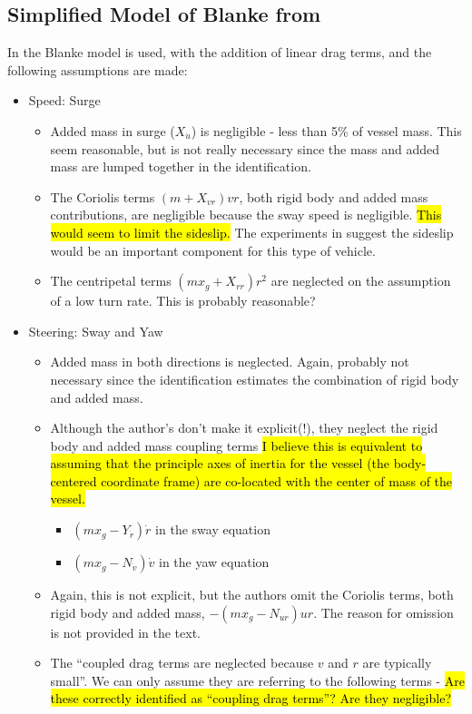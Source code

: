 \documentclass[11pt,draftcls,journal,onecolumn]{IEEEtran}
\begin{document}
\subsection{Simplified Model of Blanke from \cite{caccia08practical}}
In \cite{caccia08practical} the Blanke model is used, with the addition of linear drag terms, and the following assumptions are made:
\begin{itemize}
\item Speed: Surge
  \begin{itemize}
  \item Added mass in surge ($X_{\dot{u}}$) is negligible - less than 5\% of vessel mass.  This seem reasonable, but is not really necessary since the mass and added mass are lumped together in the identification.
  \item The Coriolis terms $(m+X_{vr})vr$, both rigid body and added mass contributions, are negligible because the sway speed is negligible.  \hl{This would seem to limit the sideslip.}  The experiments in \cite{sonnenburg10control}suggest the sideslip would be an important component for this type of vehicle.
  \item The centripetal terms $(mx_g+X_{rr})r^2$ are neglected on the assumption of a low turn rate.  This is probably reasonable?
  \end{itemize}
\item Steering: Sway and Yaw
  \begin{itemize}
  \item Added mass in both directions is neglected.  Again, probably not necessary since the identification estimates the combination of rigid body and added mass.
  \item Although the author's don't make it explicit(!), they neglect the rigid body and added mass coupling terms  \hl{I believe this is equivalent to assuming that the principle axes of inertia for the vessel (the body-centered coordinate frame) are co-located with the center of mass of the vessel.}
    \begin{itemize}
    \item $(m x_g - Y_{\dot{r}})\dot{r}$ in the sway equation
    \item $(m x_g - N_{\dot{v}})\dot{v}$ in the yaw equation
    \end{itemize}
  \item Again, this is not explicit, but the authors omit the Coriolis terms, both rigid body and added mass, $-(mx_g-N_{ur})ur$. The reason for omission is not provided in the text.
  \item The ``coupled drag terms are neglected because $v$ and $r$ are typically small''.  We can only assume they are referring to the following terms - \hl{Are these correctly identified as ``coupling drag terms''?  Are they negligible?}

\end{itemize}
\end{itemize}
\end{document}

